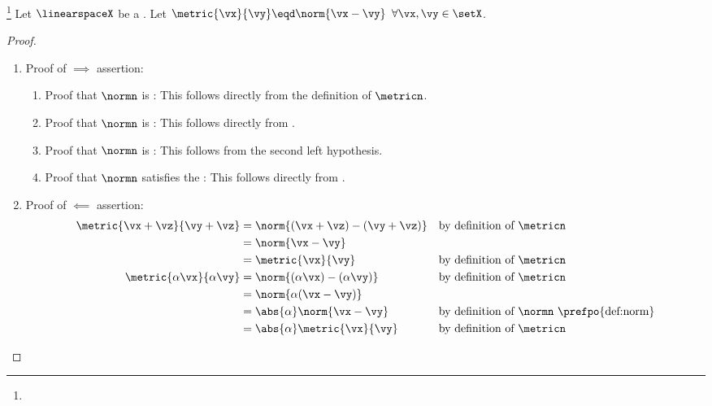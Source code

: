 \begin{theorem}
\footnote{
  }
\label{thm:vsn_d2norm}
Let $\linearspaceX$ be a .
Let $\metric{\vx}{\vy}\eqd\norm{\vx-\vy}$ $\forall\vx,\vy\in\setX$.
\end{theorem}
\begin{proof}
\begin{enumerate}
  \item Proof of $\implies$ assertion:
    \begin{enumerate}
      \item Proof that $\normn$ is : This follows directly from the definition of $\metricn$.
      \item Proof that $\normn$ is : This follows directly from .
      \item Proof that $\normn$ is : This follows from the second left hypothesis.
      \item Proof that $\normn$ satisfies the : This follows directly from .
    \end{enumerate}

  \item Proof of $\impliedby$ assertion:
    \begin{align*}
      \metric{\vx+\vz}{\vy+\vz}
        &= \norm{(\vx+\vz)-(\vy+\vz)}
        && \text{by definition of $\metricn$}
      \\&= \norm{\vx-\vy}
      \\&= \metric{\vx}{\vy}
        && \text{by definition of $\metricn$}
      \\
      \metric{\alpha\vx}{\alpha\vy}
        &= \norm{(\alpha\vx)-(\alpha\vy)}
        && \text{by definition of $\metricn$}
      \\&= \norm{\alpha(\vx-\vy)}
      \\&= \abs{\alpha}\norm{\vx-\vy}
        && \text{by definition of $\normn$ \prefpo{def:norm}}
      \\&= \abs{\alpha}\metric{\vx}{\vy}
        && \text{by definition of $\metricn$}
    \end{align*}
\end{enumerate}
\end{proof}

